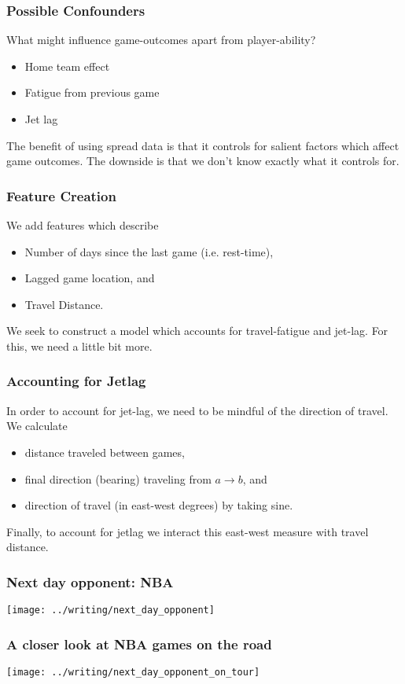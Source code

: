 \documentclass{beamer}
\begin{document}
\begin{frame}   
  \frametitle{Possible Confounders}
  What might influence game-outcomes apart from player-ability?

  \begin{itemize}     
    \item Home team effect
    \item Fatigue from previous game
    \item Jet lag   
    \end{itemize}

  The benefit of using spread data is that it controls for salient factors which affect game outcomes.
  The downside is that we don't know exactly what it controls for. \end{frame}

\begin{frame}   \frametitle{Feature Creation}
  We add features which describe
  \begin{itemize}     \item Number of days since the last game (i.e. rest-time),
    \item Lagged game location, and
    \item Travel Distance.   \end{itemize}
  We seek to construct a model which accounts for travel-fatigue and jet-lag.
  For this, we need a little bit more. \end{frame}

\begin{frame}   \frametitle{Accounting for Jetlag}
  In order to account for jet-lag, we need to be mindful of the direction of travel. We calculate
  \begin{itemize}     \item distance traveled between games,
    \item final direction (bearing) traveling from $a \to b$, and
    \item direction of travel (in east-west degrees) by taking sine.
  \end{itemize}
  Finally, to account for jetlag we interact this east-west measure with travel distance. \end{frame}

\begin{frame}   \frametitle{Next day opponent: NBA}
  \centering \texttt{[image: ../writing/next\_day\_opponent]} \end{frame}

\begin{frame}   \frametitle{A closer look at NBA games on the road}
  \centering \texttt{[image: ../writing/next\_day\_opponent\_on\_tour]} \end{frame}
\end{document}
